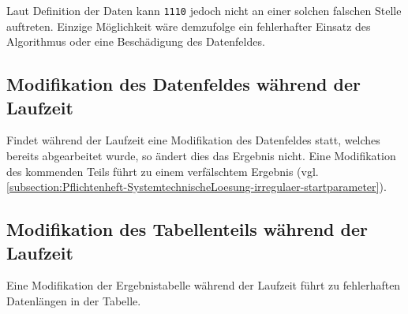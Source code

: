 Laut Definition der Daten kann \texttt{1110} jedoch nicht an einer solchen falschen Stelle auftreten. Einzige Möglichkeit wäre demzufolge ein fehlerhafter Einsatz des Algorithmus oder eine Beschädigung des Datenfeldes.

\subsection{Modifikation des Datenfeldes während der Laufzeit}
\label{subsection:Pflichtenheft-SystemtechnischeLoesung-irregulaer-moddatenfeld}

Findet während der Laufzeit eine Modifikation des Datenfeldes statt, welches bereits abgearbeitet wurde, so ändert dies das Ergebnis nicht. Eine Modifikation des kommenden Teils führt zu einem verfälschtem Ergebnis (vgl. \autoref{subsection:Pflichtenheft-SystemtechnischeLoesung-irregulaer-startparameter}).

\subsection{Modifikation des Tabellenteils während der Laufzeit}
\label{subsection:Pflichtenheft-SystemtechnischeLoesung-irregulaer-modtabelle}

Eine Modifikation der Ergebnistabelle während der Laufzeit führt zu fehlerhaften Datenlängen in der Tabelle.
